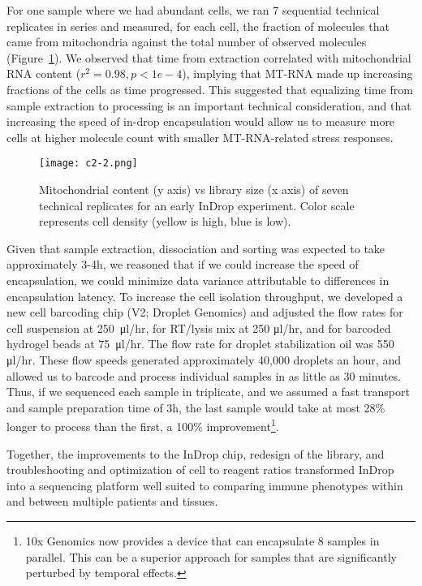For one sample where we had abundant cells, we ran 7 sequential technical replicates in series and measured, for each cell, the fraction of molecules that came from mitochondria against the total number of observed molecules (Figure~\ref{fig:c2-2}).
We observed that time from extraction correlated with mitochondrial RNA content ($r^2 = 0.98, p < 1e-4$), implying that MT-RNA made up increasing fractions of the cells as time progressed. 
This suggested that equalizing time from sample extraction to processing is an important technical consideration, and that increasing the speed of in-drop encapsulation would allow us to measure more cells at higher molecule count with smaller MT-RNA-related stress responses. 

\begin{figure} 
\centering
\texttt{[image: c2-2.png]}
\caption{Mitochondrial content (y axis) vs library size (x axis) of seven technical replicates for an early InDrop experiment. Color scale represents cell density (yellow is high, blue is low).}
\label{fig:c2-2}
\end{figure}

Given that sample extraction, dissociation and sorting was expected to take approximately 3-4h, we reasoned that if we could increase the speed of encapsulation, we could minimize data variance attributable to differences in encapsulation latency.  
To increase the cell isolation throughput, we developed a new cell barcoding chip (V2; Droplet Genomics) and adjusted the flow rates for cell suspension at 250~μl/hr, for RT/lysis mix at 250 μl/hr, and for barcoded hydrogel beads at 75~μl/hr. 
The flow rate for droplet stabilization oil was 550 μl/hr.
These flow speeds generated approximately 40,000 droplets an hour, and allowed us to barcode and process individual samples in as little as 30 minutes.
Thus, if we sequenced each sample in triplicate, and we assumed a fast transport and sample preparation time of 3h, the last sample would take at most 28\% longer to process than the first, a 100\% improvement\footnote{10x Genomics now provides a device that can encapsulate 8 samples in parallel. This can be a superior approach for samples that are significantly perturbed by temporal effects.}.

Together, the improvements to the InDrop chip, redesign of the library, and troubleshooting and optimization of cell to reagent ratios transformed InDrop into a sequencing platform well suited to comparing immune phenotypes within and between multiple patients and tissues. 

